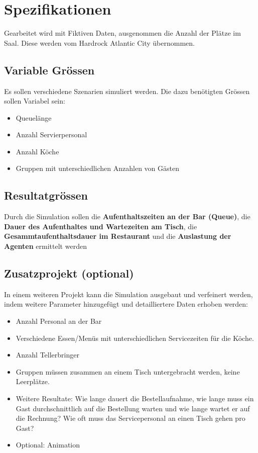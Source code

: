 \documentclass[ngerman,a4paper,12pt]{scrreprt}
\begin{document}
\section{Spezifikationen}
Gearbeitet wird mit Fiktiven Daten, ausgenommen die Anzahl der Plätze im Saal. Diese werden vom Hardrock Atlantic City übernommen.

\subsection{Variable Grössen}
Es sollen verschiedene Szenarien simuliert werden. Die dazu benötigten Grössen sollen Variabel sein:
\begin{itemize}
	\item Queuelänge
	\item Anzahl Servierpersonal
	\item Anzahl Köche
	\item Gruppen mit unterschiedlichen Anzahlen von Gästen
\end{itemize}

\subsection{Resultatgrössen}
Durch die Simulation sollen die \textbf{Aufenthaltszeiten an der Bar (Queue)}, die \textbf{Dauer des Aufenthaltes und Wartezeiten am Tisch}, die \textbf{Gesammtaufenthaltsdauer im Restaurant} und die \textbf{Auslastung der Agenten} ermittelt werden

\subsection{Zusatzprojekt (optional)}
In einem weiteren Projekt kann die Simulation ausgebaut und verfeinert werden, indem weitere Parameter hinzugefügt  und detailliertere Daten erhoben werden:
\begin{itemize}
	\item Anzahl Personal an der Bar
	\item Verschiedene Essen/Menüs mit unterschiedlichen Servicezeiten für die Köche.
	\item Anzahl Tellerbringer
	\item Gruppen müssen zusammen an einem Tisch untergebracht werden, keine Leerplätze.
	\item Weitere Resultate: Wie lange dauert die Bestellaufnahme, wie lange muss ein Gast durchschnittlich auf die Bestellung warten und wie lange wartet er auf die Rechnung? Wie oft muss das Servicepersonal an einen Tisch gehen pro Gast?
	\item Optional: Animation
\end{itemize}
\end{document}
